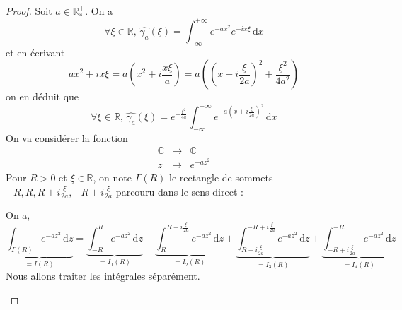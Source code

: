 	\begin{proof}
		Soit $a \in \mathbb{R}^+_*$. On a
		\[ \forall \xi \in \mathbb{R}, \, \widehat{\gamma_a}(\xi) = \int_{-\infty}^{+\infty} e^{-ax^2} e^{-ix\xi} \, \mathrm{d}x \]
		et en écrivant
		\[ ax^2 + ix\xi = a \left( x^2 + i \frac{x \xi}{a} \right) = a \left( \left( x + i \frac{\xi}{2a} \right)^2 + \frac{\xi^2}{4a^2} \right) \]
		on en déduit que
		\[ \forall \xi \in \mathbb{R}, \, \widehat{\gamma_a}(\xi) = e^{-\frac{\xi^2}{4a}} \int_{-\infty}^{+\infty} e^{-a \left( x + i \frac{\xi}{2a} \right)^2} \, \mathrm{d}x \tag{$*$} \]
		On va considérer la fonction
		\[
		\begin{array}{ccc}
			\mathbb{C} &\rightarrow& \mathbb{C} \\
			z &\mapsto& e^{-az^2}
		\end{array}
		\]
		Pour $R > 0$ et $\xi \in \mathbb{R}$, on note $\Gamma(R)$ le rectangle de sommets $-R, R, R + i\frac{\xi}{2a}, -R + i\frac{\xi}{2a}$ parcouru dans le sens direct :
		\begin{center}
		\end{center}
		On a,
		\[ \underbrace{\int_{\Gamma(R)} e^{-az^2} \, \mathrm{d}z}_{= I(R)} = \underbrace{\int_{-R}^R e^{-az^2} \, \mathrm{d}z}_{= I_1(R)} + \underbrace{\int_R^{R + i\frac{\xi}{2a}} e^{-az^2} \, \mathrm{d}z}_{= I_2(R)} + \underbrace{\int_{R + i\frac{\xi}{2a}}^{-R + i\frac{\xi}{2a}} e^{-az^2} \, \mathrm{d}z}_{= I_3(R)} + \underbrace{\int_{-R + i\frac{\xi}{2a}}^{-R} e^{-az^2} \, \mathrm{d}z}_{= I_4(R)} \]
		Nous allons traiter les intégrales séparément.
		\begin{itemize}

\end{itemize}
\end{proof}
